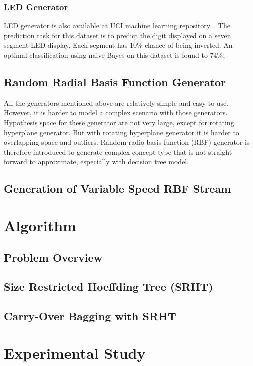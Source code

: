 \documentclass[a4paper, 11pt, oneside]{book}
\begin{document}
\subsection{LED Generator}
LED generator is also available at UCI machine learning repository~\cite{internet:ucirepo}. The prediction task for this dataset is to predict the digit displayed on a seven segment LED display. Each segment has $10\%$ chance of being inverted. An optimal classification using naive Bayes on this dataset is found to $74\%$. 

\section{Random Radial Basis Function Generator}
All the generators mentioned above are relatively simple and easy to use. However, it is harder to model a complex scenario with those generators. Hypothesis space for these generator are not very large, except for rotating hyperplane generator. But with rotating hyperplane generator it is harder to overlapping space and outliers. Random radio basis function (RBF) generator is therefore introduced to generate complex concept type that is not straight forward to approximate, especially with decision tree model.



\section{Generation of Variable Speed RBF Stream}


\chapter{Algorithm}
\section{Problem Overview}
\section{Size Restricted Hoeffding Tree (SRHT)}
\section{Carry-Over Bagging with SRHT}

\chapter{Experimental Study}
\end{document}
